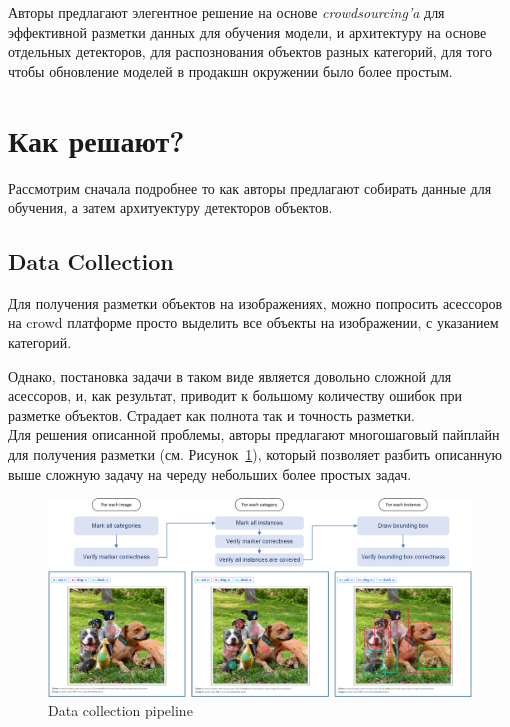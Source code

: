 Авторы предлагают элегентное решение на основе \textit{crowdsourcing'a} для эффективной разметки данных для обучения модели, и архитектуру на основе  отдельных детекторов, для распознования объектов разных категорий, для того чтобы обновление моделей в продакшн окружении было более простым.

\section*{Как решают?}

Рассмотрим сначала подробнее то как авторы предлагают собирать данные для обучения, а затем архитуектуру детекторов объектов.

\subsection*{Data Collection}

Для получения разметки объектов на изображениях, можно попросить асессоров на crowd платформе просто выделить все объекты на изображении, с указанием категорий.

Однако, постановка задачи в таком виде является довольно сложной для асессоров, и, как результат, приводит к большому количеству ошибок при разметке объектов.
Страдает как полнота так и точность разметки. \\

Для решения описанной проблемы, авторы предлагают многошаговый пайплайн для получения разметки (см. Рисунок~\ref{fig:bing_data_collection}), который позволяет разбить описанную выше сложную задачу на череду небольших более простых задач.

\begin{figure}[ht]
  \centering
  \includegraphics[width=0.9\linewidth]{images/bing_data_collection.png}
  \caption{\footnotesize{Data collection pipeline}}
  \label{fig:bing_data_collection}
\end{figure}

